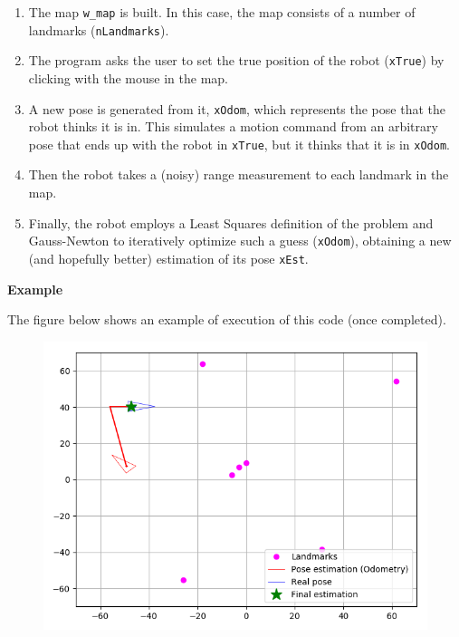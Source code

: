 \documentclass[11pt]{article}
\providecommand{\tightlist}{%
      \setlength{\itemsep}{0pt}\setlength{\parskip}{0pt}}
\begin{document}
\begin{enumerate}
\def\labelenumi{\arabic{enumi}.}
\tightlist
\item
  The map \texttt{w\_map} is built. In this case, the map consists of a
  number of landmarks (\texttt{nLandmarks}).
\item
  The program asks the user to set the true position of the robot
  (\texttt{xTrue}) by clicking with the mouse in the map.
\item
  A new pose is generated from it, \texttt{xOdom}, which represents the
  pose that the robot thinks it is in. This simulates a motion command
  from an arbitrary pose that ends up with the robot in \texttt{xTrue},
  but it thinks that it is in \texttt{xOdom}.
\item
  Then the robot takes a (noisy) range measurement to each landmark in
  the map.
\item
  Finally, the robot employs a Least Squares definition of the problem
  and Gauss-Newton to iteratively optimize such a guess
  (\texttt{xOdom}), obtaining a new (and hopefully better) estimation of
  its pose \texttt{xEst}.
\end{enumerate}

\textbf{Example}

The figure below shows an example of execution of this code (once
completed).

\begin{figure}
\centering
\includegraphics{images/fig5-1-1.png}
\end{figure}
\end{document}
